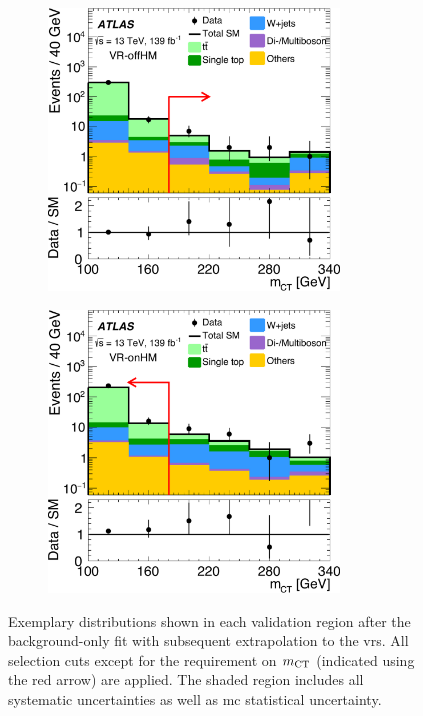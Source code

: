 \begin{figure}
\begin{subfigure}[b]{0.5\linewidth}
		\centering\includegraphics[width=0.85\textwidth]{OneLeptonbb_VR_UnderFlowBin_VRtt3offnomct2EM_mct2_yellow}
	\end{subfigure}\hfill
	\begin{subfigure}[b]{0.5\linewidth}
		\centering\includegraphics[width=0.85\textwidth]{OneLeptonbb_VR_UnderFlowBin_VRtt3onnomct2EM_mct2_yellow}
	\end{subfigure}\hfill

	\caption{Exemplary distributions shown in each validation region after the background-only fit with subsequent extrapolation to the \glspl{vr}. All selection cuts except for the requirement on $m_{\textrm{CT}}$ (indicated using the red arrow) are applied. The shaded region includes all systematic uncertainties as well as \gls{mc} statistical uncertainty.}
	\label{fig:VR_distributions_postfit}
\end{figure}

